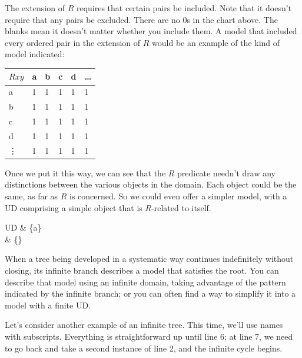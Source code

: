 The extension of $R$ requires that certain pairs be included. Note that it doesn't require that any pairs be excluded. There are no 0s in the chart above. The blanks mean it doesn't matter whether you include them. A model that included every ordered pair in the extension of $R$ would be an example of the kind of model indicated:

\begin{table}[h!]
\centering
\begin{tabular}{l|lllll}
$Rxy$   & a & b & c & d & \ldots \\ \hline
a   & 1 & 1 & 1 & 1 & 1  \\
b   & 1 & 1 & 1 & 1 & 1  \\
c   & 1 & 1 & 1 & 1 & 1   \\
d   & 1 & 1 & 1 & 1 & 1   \\
\vdots & 1 & 1 & 1 & 1 & 1
\end{tabular}
\end{table}

Once we put it this way, we can see that the $R$ predicate needn't draw any distinctions between the various objects in the domain. Each object could be the same, as far as $R$ is concerned. So we could even offer a simpler model, with a UD comprising a simple object that is $R$-related to itself.

\begin{partialmodel}
	UD & \{a\}\\
	 & \{\}
\end{partialmodel}


When a tree being developed in a systematic way continues indefinitely without closing, its infinite branch describes a model that satisfies the root. You can describe that model using an infinite domain, taking advantage of the pattern indicated by the infinite branch; or you can often find a way to simplify it into a model with a finite UD.

Let's consider another example of an infinite tree. This time, we'll use names with subscripts. Everything is straightforward up until line 6; at line 7, we need to go back and take a second instance of line 2, and the infinite cycle begins.

